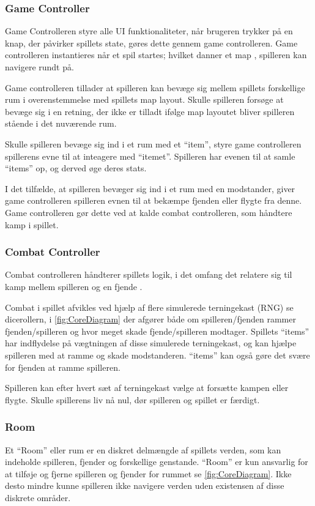 \subsubsection{Game Controller}
Game Controlleren styre alle UI funktionaliteter, når brugeren
trykker på en knap, der påvirker spillets state, gøres dette
gennem game controlleren. Game controlleren instantieres når
et spil startes; hvilket danner et map \parencite[Section 8.3.1][]
{TekniskBilag}, spilleren kan navigere rundt på. 

Game controlleren tillader at spilleren kan bevæge sig mellem
spillets forskellige rum \parencite[Section 7.3.1][]{TekniskBilag} 
i overenstemmelse med spillets map layout. Skulle spilleren forsøge at
bevæge sig i en retning, der ikke er tilladt ifølge map layoutet bliver 
spilleren stående i det nuværende rum.

Skulle spilleren bevæge sig ind i et rum med et ``item'', styre 
game controlleren spillerens evne til at inteagere med ``itemet''.
Spilleren har evenen til at samle ``items'' op, og derved øge deres
stats.

I det tilfælde, at spilleren bevæger sig ind i et rum med en modstander,
giver game controlleren spilleren evnen til at bekæmpe fjenden eller
flygte fra denne. Game controlleren gør dette ved at kalde combat controlleren,
som håndtere kamp i spillet.

\subsubsection{Combat Controller}
Combat controlleren håndterer spillets logik, i det omfang det relatere sig til
kamp mellem spilleren og en fjende \parencite[Section 7.3.3][Figur 17]{TekniskBilag}.

\noindent Combat i spillet afvikles ved hjælp af flere simulerede terningekast (RNG) se dicerollern,
i \autoref{fig:CoreDiagram} der afgører både om spilleren/fjenden rammer fjenden/spilleren 
og hvor meget skade fjende/spilleren modtager. Spillets ``items'' har indflydelse
på vægtningen af disse simulerede terningekast, og kan hjælpe spilleren med at ramme og skade 
modstanderen. ``items'' kan også gøre det svære for fjenden at ramme spilleren.

Spilleren kan efter hvert sæt af terningekast vælge at forsætte kampen eller
flygte. Skulle spillerens liv nå nul, dør spilleren og spillet er færdigt.

\subsubsection{Room}
Et ``Room'' eller rum er en diskret delmængde af spillets verden, som kan indeholde
spilleren, fjender og forskellige genstande. ``Room'' er kun ansvarlig for at tilføje
og fjerne spilleren og fjender for rummet se \autoref{fig:CoreDiagram}. Ikke desto mindre
kunne spilleren ikke navigere verden uden existensen af disse diskrete områder.

